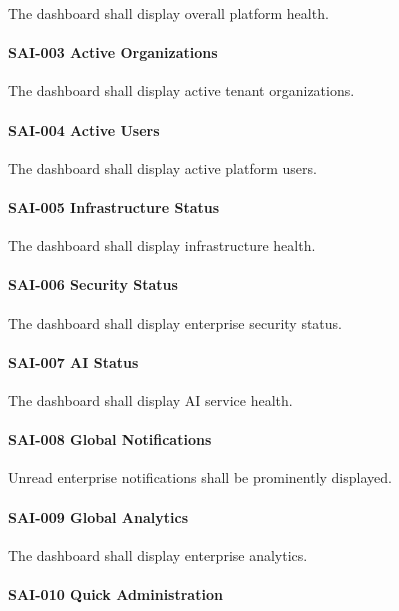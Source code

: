 The dashboard shall display overall platform health.

\paragraph{SAI-003 Active Organizations}

The dashboard shall display active tenant organizations.

\paragraph{SAI-004 Active Users}

The dashboard shall display active platform users.

\paragraph{SAI-005 Infrastructure Status}

The dashboard shall display infrastructure health.

\paragraph{SAI-006 Security Status}

The dashboard shall display enterprise security status.

\paragraph{SAI-007 AI Status}

The dashboard shall display AI service health.

\paragraph{SAI-008 Global Notifications}

Unread enterprise notifications shall be prominently displayed.

\paragraph{SAI-009 Global Analytics}

The dashboard shall display enterprise analytics.

\paragraph{SAI-010 Quick Administration}

